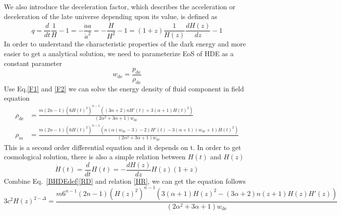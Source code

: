 \documentclass[a4paper,fleqn]{cas-sc}
\begin{document}
We also introduce the deceleration factor, which describes the acceleration or deceleration of the late universe depending upon its value, is defined as
\begin{equation}
    q=\frac{d}{dt}\frac{1}{H}-1=-\frac{\ddot{a}a}{\dot{a}^2}=-\frac{\dot{H}}{H^2}-1=(1+z)\frac{1}{H(z)}\frac{dH(z)}{dz}-1   
\end{equation}
In order to understand the characteristic properties of the dark energy and more easier to get a analytical solution, we need to parameterize EoS of HDE as a constant parameter
\begin{equation}
    w_\text{de}=\frac{p_\text{de}}{\rho_\text{de}}
\end{equation}
Use Eq.\eqref{F1} and \eqref{F2} we can solve the energy density of fluid component in field equation
\begin{align}
    \rho_\text{de}&= \frac{m (2 n-1) \left(6H(t)^2\right)^{n-1} \left((3 \alpha +2) n H'(t)+3 (\alpha +1) H(t)^2\right)}{\left(2 \alpha ^2+3 \alpha +1\right) w_\text{de}} \label{RD}\\
    \rho_m&= \frac{m (2 n-1) \left(6H(t)^2\right)^{n-1} \left(n (\alpha  (w_\text{de}-3)-2) H'(t)-3 (\alpha +1) (w_\text{de}+1) H(t)^2\right)}{\left(2 \alpha ^2+3 \alpha +1\right) w_\text{de}}\label{RM}
\end{align}
This is a second order differential equation and it depends on t. In order to get cosmological solution, there is also a simple relation between $H(t)$ and $H(z)$
\begin{equation}
    \dot{H}(t)=\frac{d}{dt}H(t)=-\frac{d H(z)}{dz}H(z)(1+z)\label{HR}
\end{equation}
Combine Eq.~\eqref{BHDEdef}\eqref{RD} and relation \eqref{HR}, we can get the equation follows
\begin{equation}
    3 c^2 H(z)^{2-\Delta}=\frac{m 6^{n-1} (2 n-1) \left(H(z)^2\right)^{n-1} \left(3 (\alpha +1) H(z)^2-(3 \alpha +2) n (z+1) H(z) H'(z)\right)}{\left(2 \alpha ^2+3 \alpha +1\right) {w_\text{de}}}
\end{equation}
\end{document}
